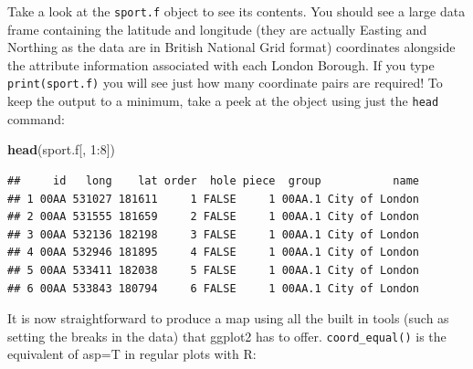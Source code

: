 \documentclass[]{article}
\newenvironment{Shaded}{}{}
\newcommand{\KeywordTok}[1]{\textcolor[rgb]{0.00,0.44,0.13}{\textbf{{#1}}}}
\newcommand{\DataTypeTok}[1]{\textcolor[rgb]{0.56,0.13,0.00}{{#1}}}
\newcommand{\DecValTok}[1]{\textcolor[rgb]{0.25,0.63,0.44}{{#1}}}
\newcommand{\StringTok}[1]{\textcolor[rgb]{0.25,0.44,0.63}{{#1}}}
\newcommand{\NormalTok}[1]{{#1}}
\begin{document}
Take a look at the \texttt{sport.f} object to see its contents. You
should see a large data frame containing the latitude and longitude
(they are actually Easting and Northing as the data are in British
National Grid format) coordinates alongside the attribute information
associated with each London Borough. If you type \texttt{print(sport.f)}
you will see just how many coordinate pairs are required! To keep the
output to a minimum, take a peek at the object using just the
\texttt{head} command:

\begin{Shaded}
\begin{Highlighting}[]
\KeywordTok{head}\NormalTok{(sport.f[, }\DecValTok{1}\NormalTok{:}\DecValTok{8}\NormalTok{])}
\end{Highlighting}
\end{Shaded}

\begin{verbatim}
##     id   long    lat order  hole piece  group           name
## 1 00AA 531027 181611     1 FALSE     1 00AA.1 City of London
## 2 00AA 531555 181659     2 FALSE     1 00AA.1 City of London
## 3 00AA 532136 182198     3 FALSE     1 00AA.1 City of London
## 4 00AA 532946 181895     4 FALSE     1 00AA.1 City of London
## 5 00AA 533411 182038     5 FALSE     1 00AA.1 City of London
## 6 00AA 533843 180794     6 FALSE     1 00AA.1 City of London
\end{verbatim}

It is now straightforward to produce a map using all the built in tools
(such as setting the breaks in the data) that ggplot2 has to offer.
\texttt{coord\_equal()} is the equivalent of asp=T in regular plots with
R:

\begin{Shaded}
\end{Shaded}
\end{document}
